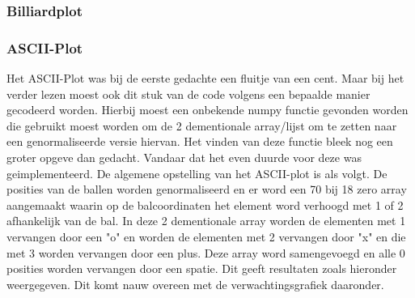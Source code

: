\documentclass{article}
\begin{document}
\subsubsection{Billiardplot}

\subsubsection{ASCII-Plot}
Het ASCII-Plot was bij de eerste gedachte een fluitje van een cent. 
Maar bij het verder lezen moest ook dit stuk van de code volgens een bepaalde manier gecodeerd worden.
Hierbij moest een onbekende numpy functie gevonden worden die gebruikt moest worden om de 2 dementionale array/lijst om te zetten naar een genormaliseerde versie hiervan.
Het vinden van deze functie bleek nog een groter opgeve dan gedacht.
Vandaar dat het even duurde voor deze was geimplementeerd. 
De algemene opstelling van het ASCII-plot is als volgt.
De posities van de ballen worden genormaliseerd en er word een 70 bij 18 zero array aangemaakt waarin op de balcoordinaten het element word verhoogd met 1 of 2 afhankelijk van de bal.
In deze 2 dementionale array worden de elementen met 1 vervangen door een "o" en worden de elementen met 2 vervangen door "x" en die met 3 worden vervangen door een plus.
Deze array word samengevoegd en alle 0 posities worden vervangen door een spatie. Dit geeft resultaten zoals hieronder weergegeven.
Dit komt nauw overeen met de verwachtingsgrafiek daaronder. 
\end{document}
